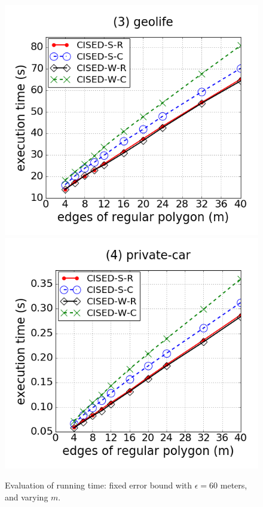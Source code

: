 \begin{figure}[tb!]
\includegraphics[scale = 0.250]{figures/Exp-M-e-60-time-geolife.png}
\includegraphics[scale = 0.250]{figures/Exp-M-e-60-time-private.png}
\vspace{-2ex}
\caption{\small Evaluation of running time: fixed error bound with $\epsilon=60$ meters, and varying $m$. }
\label{fig:m-time-e60}
\vspace{-2ex}
\end{figure}




